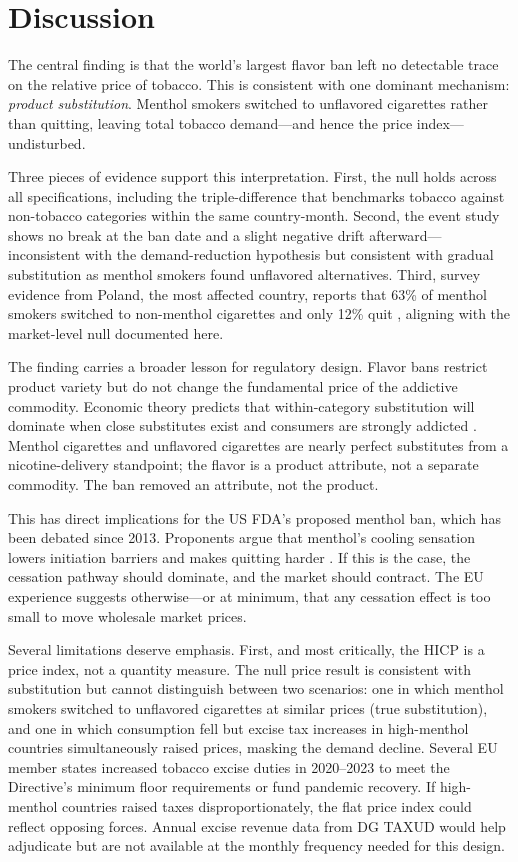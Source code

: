 \documentclass[12pt]{article}
\begin{document}
\section{Discussion}

The central finding is that the world's largest flavor ban left no detectable trace on the relative price of tobacco. This is consistent with one dominant mechanism: \textit{product substitution}. Menthol smokers switched to unflavored cigarettes rather than quitting, leaving total tobacco demand---and hence the price index---undisturbed.

Three pieces of evidence support this interpretation. First, the null holds across all specifications, including the triple-difference that benchmarks tobacco against non-tobacco categories within the same country-month. Second, the event study shows no break at the ban date and a slight negative drift afterward---inconsistent with the demand-reduction hypothesis but consistent with gradual substitution as menthol smokers found unflavored alternatives. Third, survey evidence from Poland, the most affected country, reports that 63\% of menthol smokers switched to non-menthol cigarettes and only 12\% quit \citep{zatonski2021menthol}, aligning with the market-level null documented here.

The finding carries a broader lesson for regulatory design. Flavor bans restrict product variety but do not change the fundamental price of the addictive commodity. Economic theory predicts that within-category substitution will dominate when close substitutes exist and consumers are strongly addicted \citep{becker1988theory}. Menthol cigarettes and unflavored cigarettes are nearly perfect substitutes from a nicotine-delivery standpoint; the flavor is a product attribute, not a separate commodity. The ban removed an attribute, not the product.

This has direct implications for the US FDA's proposed menthol ban, which has been debated since 2013. Proponents argue that menthol's cooling sensation lowers initiation barriers and makes quitting harder \citep{villanti2017flavored}. If this is the case, the cessation pathway should dominate, and the market should contract. The EU experience suggests otherwise---or at minimum, that any cessation effect is too small to move wholesale market prices.

Several limitations deserve emphasis. First, and most critically, the HICP is a price index, not a quantity measure. The null price result is consistent with substitution but cannot distinguish between two scenarios: one in which menthol smokers switched to unflavored cigarettes at similar prices (true substitution), and one in which consumption fell but excise tax increases in high-menthol countries simultaneously raised prices, masking the demand decline. Several EU member states increased tobacco excise duties in 2020--2023 to meet the Directive's minimum floor requirements or fund pandemic recovery. If high-menthol countries raised taxes disproportionately, the flat price index could reflect opposing forces. Annual excise revenue data from DG TAXUD would help adjudicate but are not available at the monthly frequency needed for this design.
\end{document}
